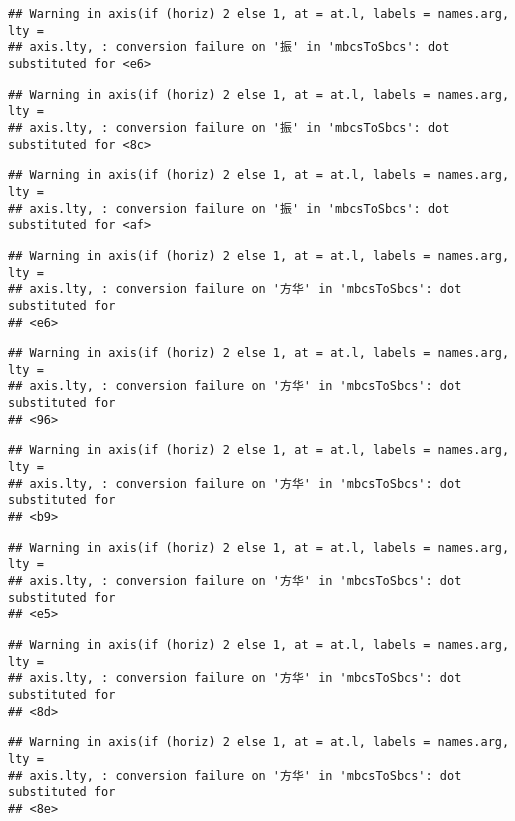 \documentclass[
]{article}
\begin{document}
\begin{verbatim}
## Warning in axis(if (horiz) 2 else 1, at = at.l, labels = names.arg, lty =
## axis.lty, : conversion failure on '振' in 'mbcsToSbcs': dot substituted for <e6>
\end{verbatim}

\begin{verbatim}
## Warning in axis(if (horiz) 2 else 1, at = at.l, labels = names.arg, lty =
## axis.lty, : conversion failure on '振' in 'mbcsToSbcs': dot substituted for <8c>
\end{verbatim}

\begin{verbatim}
## Warning in axis(if (horiz) 2 else 1, at = at.l, labels = names.arg, lty =
## axis.lty, : conversion failure on '振' in 'mbcsToSbcs': dot substituted for <af>
\end{verbatim}

\begin{verbatim}
## Warning in axis(if (horiz) 2 else 1, at = at.l, labels = names.arg, lty =
## axis.lty, : conversion failure on '方华' in 'mbcsToSbcs': dot substituted for
## <e6>
\end{verbatim}

\begin{verbatim}
## Warning in axis(if (horiz) 2 else 1, at = at.l, labels = names.arg, lty =
## axis.lty, : conversion failure on '方华' in 'mbcsToSbcs': dot substituted for
## <96>
\end{verbatim}

\begin{verbatim}
## Warning in axis(if (horiz) 2 else 1, at = at.l, labels = names.arg, lty =
## axis.lty, : conversion failure on '方华' in 'mbcsToSbcs': dot substituted for
## <b9>
\end{verbatim}

\begin{verbatim}
## Warning in axis(if (horiz) 2 else 1, at = at.l, labels = names.arg, lty =
## axis.lty, : conversion failure on '方华' in 'mbcsToSbcs': dot substituted for
## <e5>
\end{verbatim}

\begin{verbatim}
## Warning in axis(if (horiz) 2 else 1, at = at.l, labels = names.arg, lty =
## axis.lty, : conversion failure on '方华' in 'mbcsToSbcs': dot substituted for
## <8d>
\end{verbatim}

\begin{verbatim}
## Warning in axis(if (horiz) 2 else 1, at = at.l, labels = names.arg, lty =
## axis.lty, : conversion failure on '方华' in 'mbcsToSbcs': dot substituted for
## <8e>
\end{verbatim}
\end{document}
